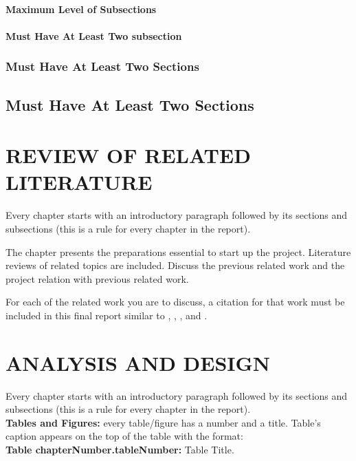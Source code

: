 \documentclass[10pt]{report}
\begin{document}
        \subsubsection{Maximum Level of Subsections}
        \subsubsection{Must Have At Least Two subsection}
    \subsection{Must Have At Least Two Sections}
\section{Must Have At Least Two Sections}



\chapter{REVIEW OF RELATED LITERATURE}
Every chapter starts with an introductory paragraph followed by its sections and subsections (this is a rule for every chapter in the report).

The chapter presents the preparations essential to start up the project. Literature reviews of related topics are included. Discuss the previous related work and the project relation with previous related work.

For each of the related work you are to discuss, a citation for that work must be included in this final report similar to \cite{1989:Rabiner}, \cite{custers2016future}, \cite{IEEEreferencias:Ref2}, and \cite{bourke2007evaluation}.



\chapter{ANALYSIS AND DESIGN}
Every chapter starts with an introductory paragraph followed by its sections and subsections (this is a rule for every chapter in the report).\\

\textbf{Tables and Figures:} every table/figure has a number and a title. Table's caption appears on the top of the table with the format:\\
\textbf{Table chapterNumber.tableNumber:} Table Title.\\
\end{document}
